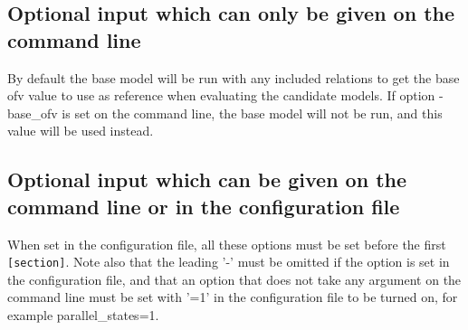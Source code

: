 \subsection{Optional input which can only be given on the command line}
\begin{optionlist}
By default the base model will be run with any included relations to get the base ofv value to use as reference when evaluating the candidate models. If option -base\_ofv is set on the command line, the base model will not be run, and this value will be used instead.
\nextopt
\end{optionlist}

\subsection{Optional input which can be given on the command line or in the configuration file}
When set in the configuration file, all these options must be set before the first \verb|[section]|. Note also that the leading '-' must be omitted if the option is set in the configuration file, and that an option that does not take any argument on the command line must be set with '=1' in the configuration file to be turned on, for example parallel\_states=1.
